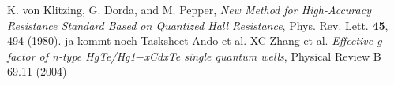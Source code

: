 \begin{thebibliography}{99}
     K. von Klitzing, G. Dorda, and M. Pepper, \emph{New Method for High-Accuracy
    Resistance Standard Based on Quantized Hall Resistance}, Phys. Rev. Lett. \textbf{45}, 494 (1980).
     ja kommt noch
     Tasksheet
     Ando et al.
     XC Zhang et al. \emph{Effective g factor of n-type HgTe/Hg1$−$xCdxTe single quantum wells}, 
                    Physical Review B 69.11 (2004)
\end{thebibliography}